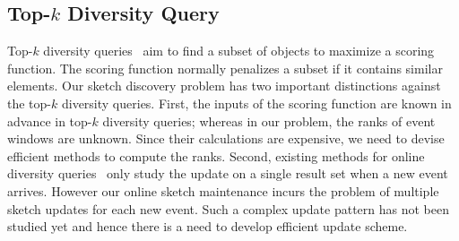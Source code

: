 \subsection{Top-$k$ Diversity Query}
Top-$k$ diversity queries~\cite{agrawal2009diversifying,borodin2012max,drosou2014diverse,chen2015diversity}
aim to find a subset of objects to maximize a scoring function. The scoring function normally penalizes
a subset if it contains similar elements. Our sketch discovery problem has two important distinctions
 against the top-$k$ diversity queries.
First, the inputs of the scoring function are known in advance in top-$k$ diversity queries; whereas in our problem, the ranks of event windows are unknown. Since their calculations are expensive, we need to devise efficient methods to compute the ranks.
Second, existing methods for online diversity queries~\cite{borodin2012max,drosou2014diverse,chen2015diversity} only study
the update on a single result set when a new event arrives. However our online sketch maintenance 
incurs the problem of multiple sketch updates for each new event. Such a complex update pattern has not been studied yet and hence there is a need to develop efficient update scheme.



